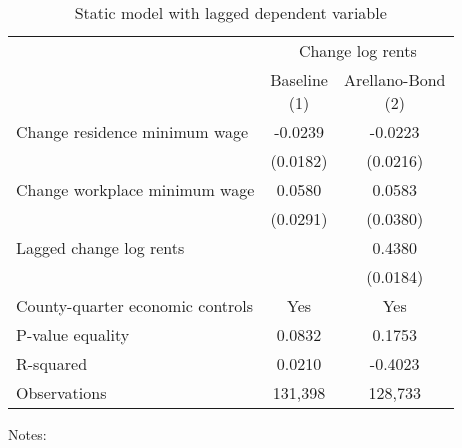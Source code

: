 \begin{table}
    \caption{Static model with lagged dependent variable}
    \label{tab:static_ab}

    \begin{tabular}{@{}lcc@{}}
        \toprule
                               & \multicolumn{2}{c}{Change log rents}                       \\ \cmidrule(l){2-3}
                               & \shortsack{Baseline\\(1)} & \shortsack{Arellano-Bond\\(2)} \\ \midrule
        Change residence minimum wage     &  -0.0239           &  -0.0223                           \\
                                          & (0.0182)          & (0.0216)                          \\
        Change workplace minimum wage     &  0.0580           & 0.0583                            \\
                                          & (0.0291)          & (0.0380)                          \\
        Lagged change log rents           &                & 0.4380                            \\
                                          &                & (0.0184)                          \\ \midrule
        County-quarter economic controls  & Yes            & Yes                            \\
        P-value equality                  & 0.0832            & 0.1753                            \\
        R-squared                         & 0.0210            & -0.4023                            \\
        Observations                      & 131,398           & 128,733                           \\ \bottomrule
    \end{tabular}

    \begin{minipage}{.95\textwidth} \footnotesize
        \vspace{2mm}
        Notes: 
    \end{minipage}
\end{table}
